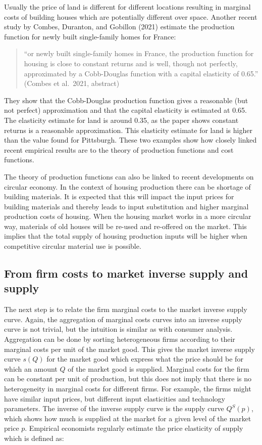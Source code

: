 \documentclass[
]{book}
\begin{document}
Usually the price of land is different for different locations resulting in marginal costs of building houses which are potentially different over space. Another recent study by Combes, Duranton, and Gobillon (2021) estimate the production function for newly built single-family homes for France:

\begin{quote}
``or newly built single-family homes in France, the production function for housing is close to constant returns and is well, though not perfectly, approximated by a Cobb-Douglas function with a capital elasticity of 0.65.'' (Combes et al.~2021, abstract)
\end{quote}

They show that the Cobb-Douglas production function gives a reasonable (but not perfect) approximation and that the capital elasticity is estimated at 0.65. The elasticity estimate for land is around 0.35, as the paper shows constant returns is a reasonable approximation. This elasticity estimate for land is higher than the value found for Pittsburgh. These two examples show how closely linked recent empirical results are to the theory of production functions and cost functions.

The theory of production functions can also be linked to recent developments on circular economy. In the context of housing production there can be shortage of building materials. It is expected that this will impact the input prices for building materials and thereby leads to input substitution and higher marginal production costs of housing. When the housing market works in a more circular way, materials of old houses will be re-used and re-offered on the market. This implies that the total supply of housing production inputs will be higher when competitive circular material use is possible.

\hypertarget{from-firm-costs-to-market-inverse-supply-and-supply}{%
\subsection{From firm costs to market inverse supply and supply}\label{from-firm-costs-to-market-inverse-supply-and-supply}}

The next step is to relate the firm marginal costs to the market inverse supply curve. Again, the aggregation of marginal costs curves into an inverse supply curve is not trivial, but the intuition is similar as with consumer analysis. Aggregation can be done by sorting heterogeneous firms according to their marginal costs per unit of the market good. This gives the market inverse supply curve \(s(Q)\) for the market good which express what the price should be for which an amount \(Q\) of the market good is supplied. Marginal costs for the firm can be constant per unit of production, but this does not imply that there is no heterogeneity in marginal costs for different firms. For example, the firms might have similar input prices, but different input elasticities and technology parameters. The inverse of the inverse supply curve is the supply curve \(Q^S(p)\), which shows how much is supplied at the market for a given level of the market price \(p\). Empirical economists regularly estimate the price elasticity of supply which is defined as:
\end{document}
